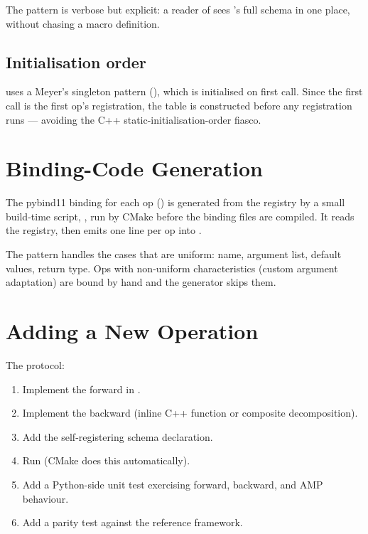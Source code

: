 The pattern is verbose but explicit: a reader of
 sees 's full schema in one place,
without chasing a macro definition.

\subsection{Initialisation order}
\label{ssec:op_registry:init_order}

 uses a Meyer's singleton pattern
(), which is initialised on
first call. Since the first call is the first op's registration,
the table is constructed before any registration runs --- avoiding
the C++ static-initialisation-order fiasco.

\section{Binding-Code Generation}
\label{sec:op_registry:codegen}

The pybind11 binding for each op
() is generated from the registry by
a small build-time script, , run by
CMake before the binding files are compiled. It reads the
registry, then emits one  line per op into
.

The pattern handles the cases that are uniform: name, argument
list, default values, return type. Ops with non-uniform
characteristics (custom argument adaptation) are bound by hand and
the generator skips them.

\section{Adding a New Operation}
\label{sec:op_registry:adding}

The protocol:

\begin{enumerate}
  \item Implement the forward in
    .
  \item Implement the backward (inline C++ function or composite
    decomposition).
  \item Add the self-registering schema declaration.
  \item Run  (CMake does this
    automatically).
  \item Add a Python-side unit test exercising forward, backward,
    and AMP behaviour.
  \item Add a parity test against the reference framework.
\end{enumerate}

